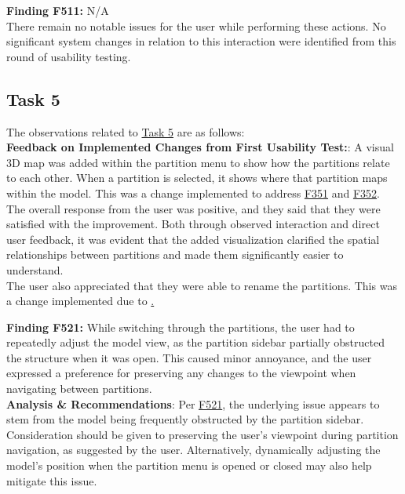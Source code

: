 \documentclass{article}
\begin{document}
\noindent \hypertarget{finding:F511}{\textbf{Finding F511:}} N/A\\

\noindent There remain no notable issues for the user while performing these actions. No significant system changes in relation to this interaction were identified from this round of usability testing.

\subsection{Task 5}

\noindent The observations related to \hyperlink{task:T5}{Task 5} are as follows:\\

\noindent \textbf{Feedback on Implemented Changes from First Usability Test:}: A visual 3D map was added within the partition menu to show how the partitions relate to each other. When a partition is selected, it shows where that partition maps within the model. This was a change implemented to address \hyperlink{finding:F351}{F351} and \hyperlink{finding:F352}{F352}. The overall response from the user was positive, and they said that they were satisfied with the improvement. Both through observed interaction and direct user feedback, it was evident that the added visualization clarified the spatial relationships between partitions and made them significantly easier to understand.\\

\noindent The user also appreciated that they were able to rename the partitions. This was a change implemented due to \hyperlink{finding:F353}.

\noindent \hypertarget{finding:F521}{\textbf{Finding F521:}} 
While switching through the partitions, the user had to repeatedly adjust the model view, as the partition sidebar partially obstructed the structure when it was open. This caused minor annoyance, and the user expressed a preference for preserving any changes to the viewpoint when navigating between partitions.\\ 

\noindent \textbf{Analysis \& Recommendations}:
Per \hyperlink{finding:F521}{F521}, the underlying issue appears to stem from the model being frequently obstructed by the partition sidebar. Consideration should be given to preserving the user’s viewpoint during partition navigation, as suggested by the user. Alternatively, dynamically adjusting the model’s position when the partition menu is opened or closed may also help mitigate this issue.
\end{document}
